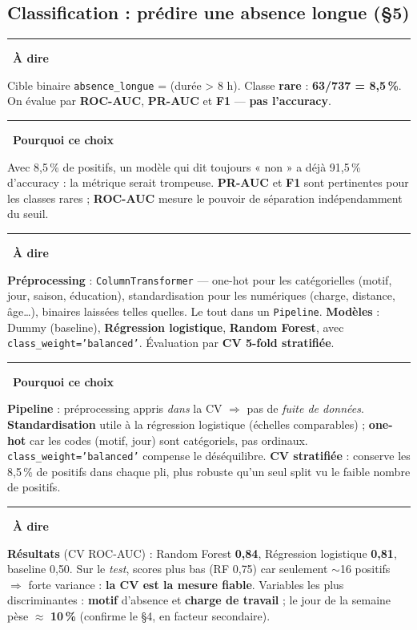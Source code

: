 \documentclass[11pt,a4paper]{article}
\newcommand{\code}[1]{\texttt{#1}}
\newenvironment{say}{\par\medskip\noindent\textcolor{blue!45!black}{\rule[-1pt]{3pt}{12pt}}\
  \textbf{\textcolor{blue!45!black}{À dire}}\par\nopagebreak\smallskip\noindent\ignorespaces}{\par\medskip}
\newenvironment{why}{\par\medskip\noindent\textcolor{orange!60!black}{\rule[-1pt]{3pt}{12pt}}\
  \textbf{\textcolor{orange!60!black}{Pourquoi ce choix}}\par\nopagebreak\smallskip\noindent\ignorespaces}{\par\medskip}
\begin{document}
\subsection{Classification : prédire une absence longue (\S5)}
\begin{say}
Cible binaire \code{absence\_longue} = (durée > 8 h). Classe \textbf{rare} : \textbf{63/737 =
8{,}5\,\%}. On évalue par \textbf{ROC-AUC}, \textbf{PR-AUC} et \textbf{F1} --- \textbf{pas
l'accuracy}.
\end{say}
\begin{why}
Avec 8{,}5\,\% de positifs, un modèle qui dit toujours « non » a déjà 91{,}5\,\% d'accuracy : la
métrique serait trompeuse. \textbf{PR-AUC} et \textbf{F1} sont pertinentes pour les classes rares ;
\textbf{ROC-AUC} mesure le pouvoir de séparation indépendamment du seuil.
\end{why}
\begin{say}
\textbf{Préprocessing} : \code{ColumnTransformer} --- one-hot pour les catégorielles (motif, jour,
saison, éducation), standardisation pour les numériques (charge, distance, âge\dots), binaires
laissées telles quelles. Le tout dans un \code{Pipeline}. \textbf{Modèles} : Dummy (baseline),
\textbf{Régression logistique}, \textbf{Random Forest}, avec \code{class\_weight='balanced'}.
Évaluation par \textbf{CV 5-fold stratifiée}.
\end{say}
\begin{why}
\textbf{Pipeline} : préprocessing appris \emph{dans} la CV $\Rightarrow$ pas de \emph{fuite de
données}. \textbf{Standardisation} utile à la régression logistique (échelles comparables) ;
\textbf{one-hot} car les codes (motif, jour) sont catégoriels, pas ordinaux.
\code{class\_weight='balanced'} compense le déséquilibre. \textbf{CV stratifiée} : conserve les
8{,}5\,\% de positifs dans chaque pli, plus robuste qu'un seul split vu le faible nombre de positifs.
\end{why}
\begin{say}
\textbf{Résultats} (CV ROC-AUC) : Random Forest \textbf{0{,}84}, Régression logistique
\textbf{0{,}81}, baseline 0{,}50. Sur le \emph{test}, scores plus bas (RF 0{,}75) car seulement
$\sim$16 positifs $\Rightarrow$ forte variance : \textbf{la CV est la mesure fiable}. Variables
les plus discriminantes : \textbf{motif} d'absence et \textbf{charge de travail} ; le jour de la
semaine pèse $\approx$ \textbf{10\,\%} (confirme le \S4, en facteur secondaire).
\end{say}
\end{document}
